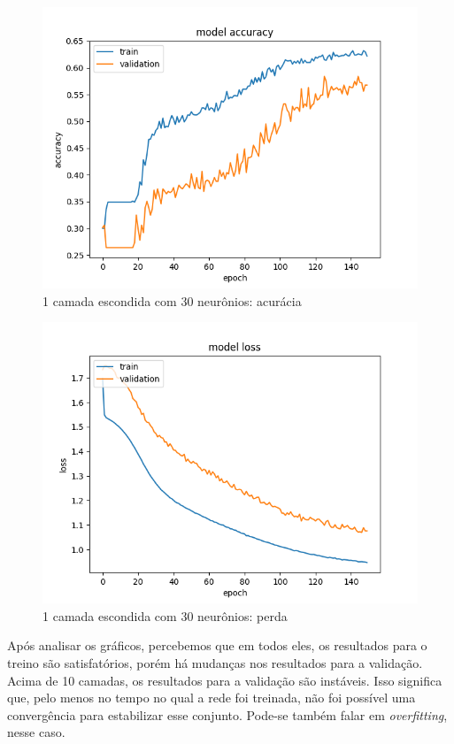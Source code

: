 \documentclass[11pt]{article}
\begin{document}
\begin{figure}
	\includegraphics[width=\linewidth]{exp/Figure_4.png}
	\caption{1 camada escondida com 30 neurônios: acurácia}
	\label{fig:f4}
\end{figure}

\begin{figure}
	\includegraphics[width=\linewidth]{exp/Figure_4-2.png}
	\caption{1 camada escondida com 30 neurônios: perda}
	\label{fig:f41}
\end{figure}

Após analisar os gráficos, percebemos que em todos eles, os resultados para o treino são satisfatórios, porém há mudanças nos resultados para a validação. Acima de 10 camadas, os resultados para a validação são instáveis. Isso significa que, pelo menos no tempo no qual a rede foi treinada, não foi possível uma convergência para estabilizar esse conjunto. Pode-se também falar em \textit{overfitting}, nesse caso. 
\end{document}
